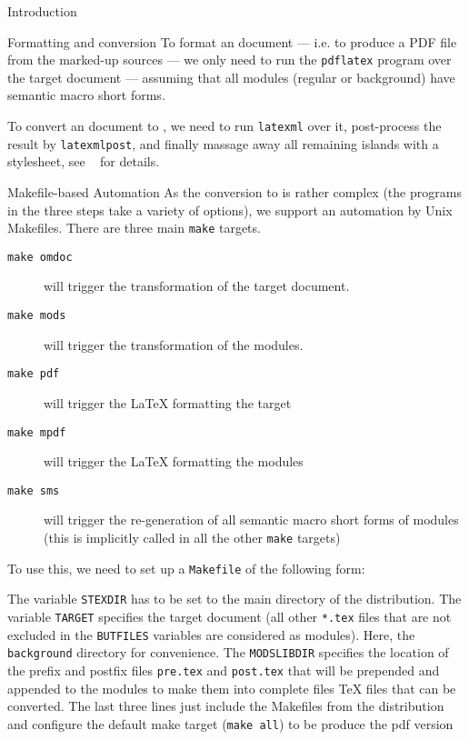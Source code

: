 \begin{omgroup}[id=intro]{Introduction}
\begin{omgroup}{Formatting and {\omdoc} conversion}
  To format an {\sTeX} document --- i.e. to produce a PDF file from the {\sTeX} marked-up
  sources --- we only need to run the {\texttt{pdflatex}} program over the target document
  --- assuming that all modules (regular or background) have semantic macro short forms.

  To convert an {\sTeX} document to {\omdoc}, we need to run {\texttt{latexml}} over it,
  post-process the result by {\texttt{latexmlpost}}, and finally massage away all remaining
  {\latexml} islands with a stylesheet, see ~\cite{Kohlhase:ssmtl*} for details.
\end{omgroup}

\begin{omgroup}{Makefile-based Automation}
 As the conversion to {\omdoc} is rather complex (the programs in the three steps take a
  variety of options), we support an automation by Unix Makefiles. There are three main
  {\texttt{make}} targets.

  \begin{description}
  \item[{\texttt{make omdoc}}] will trigger the {\omdoc} transformation of the target
    document.
  \item[{\texttt{make mods}}] will trigger the {\omdoc} transformation of the modules.
  \item[{\texttt{make pdf}}] will trigger the {\LaTeX} formatting the target
  \item[{\texttt{make mpdf}}] will trigger the {\LaTeX} formatting the modules
  \item[{\texttt{make sms}}] will trigger the re-generation of all semantic macro short
    forms of modules (this is implicitly called in all the other {\texttt{make}} targets)
  \end{description}
  To use this, we need to set up a {\texttt{{Makefile}}} of the following form:
 
\lstset{columns=flexible,frame=lines,numbers=left,stepnumber=2,numberstyle=\tiny,basicstyle=\small}
 

  The variable {\lstinline{STEXDIR}} has to be set to the main directory of the {\sTeX}
  distribution. The variable {\lstinline{TARGET}} specifies the target document (all other
  {\texttt{*.tex}} files that are not excluded in the {\lstinline{BUTFILES}} variables are
  considered as modules). Here, the {\texttt{background}} directory for convenience. The
  {\lstinline{MODSLIBDIR}} specifies the location of the prefix and postfix files
  {\texttt{pre.tex}} and {\texttt{post.tex}} that will be prepended and appended to the
  modules to make them into complete files {\TeX} files that can be converted. The last
  three lines just include the Makefiles from the {\sTeX} distribution and configure the
  default make target (\texttt{make all}) to be produce the pdf version 


\end{omgroup}
\end{omgroup}

